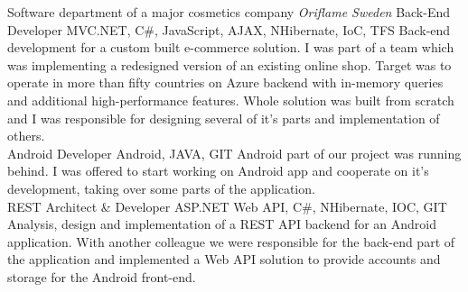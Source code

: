 \documentclass[]{friggeri-cv} %
\begin{document}
\begin{entrylist}
  {Software department of a major cosmetics company \emph{Oriflame Sweden}}
  {
    \position
    {Back-End Developer}
    {MVC.NET, C\#, JavaScript, AJAX, NHibernate, IoC, TFS}
    {Back-end development for a custom built e-commerce solution.
    I was part of a team which was implementing a redesigned version of an existing online shop.
    Target was to operate in more than fifty countries on Azure backend with in-memory queries and additional high-performance features.
    Whole solution was built from scratch and I was responsible for designing several of it's parts and implementation of others.}\\
    \position
    {Android Developer}
    {Android, JAVA, GIT}
    {Android part of our project was running behind.
    I was offered to start working on Android app and cooperate on it's development, taking over some parts of the application.}\\
    \position
    {REST Architect \& Developer}
    {ASP.NET Web API, C\#, NHibernate, IOC, GIT}
    {Analysis, design and implementation of a REST API backend for an Android application.
    With another colleague we were responsible for the back-end part of the application and implemented a Web API solution to provide
    accounts and storage for the Android front-end.}%
  }
\end{entrylist}
\end{document}
